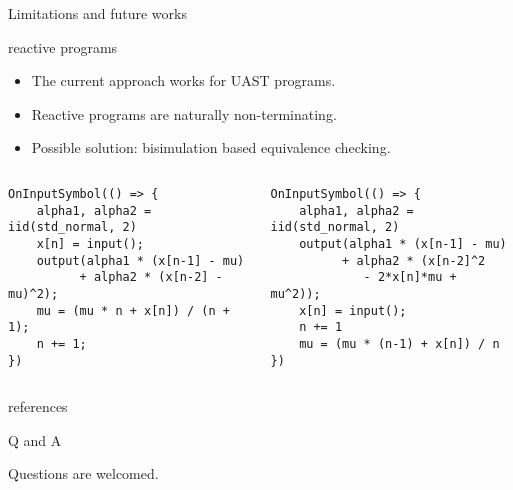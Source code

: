 \documentclass[8pt]{beamer}
\begin{document}
\begin{frame}{Limitations and future works}
	\begin{block}{reactive programs}
		\begin{itemize}
			\item The current approach works for UAST programs.
			\item Reactive programs are naturally non-terminating.
			\item Possible solution: bisimulation based equivalence checking.
		\end{itemize}
		\begin{columns}
			\begin{column}{0.5\textwidth}
				\begin{verbatim}
OnInputSymbol(() => {
    alpha1, alpha2 = iid(std_normal, 2)
    x[n] = input();
    output(alpha1 * (x[n-1] - mu) 
          + alpha2 * (x[n-2] - mu)^2);
    mu = (mu * n + x[n]) / (n + 1);
    n += 1;
})\end{verbatim}
			\end{column}
			\begin{column}{0.5\textwidth}
				\begin{verbatim}
OnInputSymbol(() => {
    alpha1, alpha2 = iid(std_normal, 2)
    output(alpha1 * (x[n-1] - mu) 
          + alpha2 * (x[n-2]^2 
             - 2*x[n]*mu + mu^2));
    x[n] = input();
    n += 1
    mu = (mu * (n-1) + x[n]) / n
})\end{verbatim}
			\end{column}
		\end{columns}
	\end{block}
\end{frame}

\appendix

\begin{frame}[allowframebreaks]{references}
	\nocite{*}
	\printbibliography
\end{frame}

\begin{frame}{Q and A}
	\begin{center}
		Questions are welcomed.
	\end{center}
\end{frame}
\end{document}
